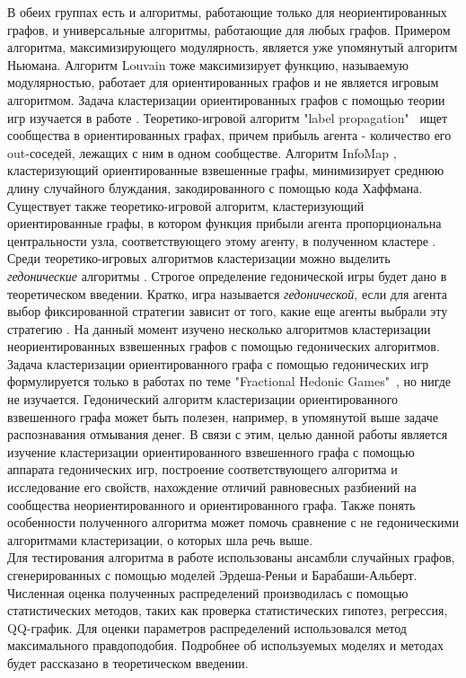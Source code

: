 В обеих группах есть и алгоритмы, работающие только для неориентированных графов, и универсальные алгоритмы, работающие для любых графов. Примером алгоритма, максимизирующего модулярность, является уже упомянутый алгоритм Ньюмана. Алгоритм Louvain тоже максимизирует функцию, называемую модулярностью, работает для ориентированных графов и не является игровым алгоритмом. Задача кластеризации ориентированных графов с помощью теории игр изучается в работе \cite{mining}. Теоретико-игровой алгоритм "label propagation"\ \cite{Raghavan} ищет сообщества в ориентированных графах, причем прибыль агента - количество его out-соседей, лежащих с ним в одном сообществе. Алгоритм InfoMap \cite{infomap}, кластеризующий ориентированные взвешенные графы, минимизирует среднюю длину случайного блуждания, закодированного с помощью кода Хаффмана. Существует также теоретико-игровой алгоритм, кластеризующий ориентированные графы, в котором функция прибыли агента пропорциональна центральности узла, соответствующего этому агенту, в полученном кластере \cite{Balliu}.\\

Среди теоретико-игровых алгоритмов кластеризации можно выделить \textit{гедонические} алгоритмы \cite{clusteringhg}. Строгое определение гедонической игры будет дано в теоретическом введении. Кратко, игра называется \textit{гедонической}, если для агента выбор фиксированной стратегии зависит от того, какие еще агенты выбрали эту стратегию \cite{framework}. На данный момент изучено несколько алгоритмов кластеризации неориентированных взвешенных графов \cite{clusteringhg} с помощью гедонических алгоритмов. Задача кластеризации ориентированного графа с помощью гедонических игр формулируется только в работах по теме "Fractional Hedonic Games"\ \cite{fhg2017}, но нигде не изучается. Гедонический алгоритм кластеризации ориентированного взвешенного графа может быть полезен, например, в упомянутой выше задаче распознавания отмывания денег. В связи с этим, целью данной работы является изучение кластеризации ориентированного взвешенного графа с помощью аппарата гедонических игр, построение соответствующего алгоритма и исследование его свойств, нахождение отличий равновесных разбиений на сообщества неориентированного и ориентированного графа. Также понять особенности полученного алгоритма может помочь сравнение с не гедоническими алгоритмами кластеризации, о которых шла речь выше.\\

Для тестирования алгоритма в работе использованы ансамбли случайных графов, сгенерированных с помощью моделей Эрдеша-Реньи и Барабаши-Альберт. Численная оценка полученных распределений производилась с помощью статистических методов, таких как проверка статистических гипотез, регрессия, QQ-график. Для оценки параметров распределений использовался метод максимального правдоподобия. Подробнее об используемых моделях и методах будет рассказано в теоретическом введении. 